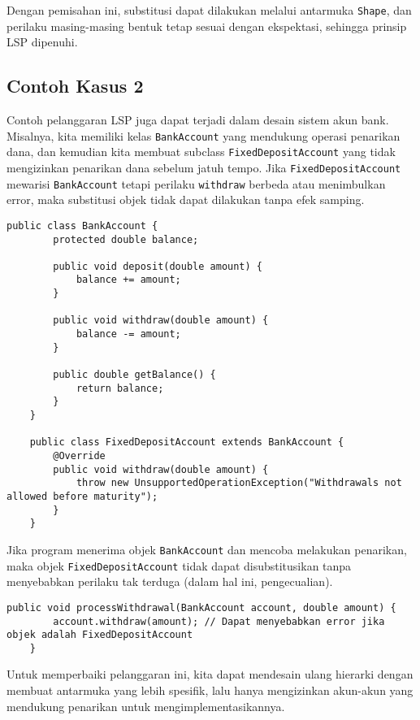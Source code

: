 Dengan pemisahan ini, substitusi dapat dilakukan melalui antarmuka \texttt{Shape}, dan perilaku masing-masing bentuk tetap sesuai dengan ekspektasi, sehingga prinsip LSP dipenuhi.


\subsection{Contoh Kasus 2}
Contoh pelanggaran LSP juga dapat terjadi dalam desain sistem akun bank. Misalnya, kita memiliki kelas \texttt{BankAccount} yang mendukung operasi penarikan dana, dan kemudian kita membuat subclass \texttt{FixedDepositAccount} yang tidak mengizinkan penarikan dana sebelum jatuh tempo. Jika \texttt{FixedDepositAccount} mewarisi \texttt{BankAccount} tetapi perilaku \texttt{withdraw} berbeda atau menimbulkan error, maka substitusi objek tidak dapat dilakukan tanpa efek samping.

\begin{lstlisting}[style=JavaStyle, caption={Contoh pelanggaran LSP}]
	public class BankAccount {
		protected double balance;
		
		public void deposit(double amount) {
			balance += amount;
		}
		
		public void withdraw(double amount) {
			balance -= amount;
		}
		
		public double getBalance() {
			return balance;
		}
	}
	
	public class FixedDepositAccount extends BankAccount {
		@Override
		public void withdraw(double amount) {
			throw new UnsupportedOperationException("Withdrawals not allowed before maturity");
		}
	}
\end{lstlisting}

Jika program menerima objek \texttt{BankAccount} dan mencoba melakukan penarikan, maka objek \texttt{FixedDepositAccount} tidak dapat disubstitusikan tanpa menyebabkan perilaku tak terduga (dalam hal ini, pengecualian).

\begin{lstlisting}[style=JavaStyle, caption={Pemanggilan yang melanggar LSP}]
	public void processWithdrawal(BankAccount account, double amount) {
		account.withdraw(amount); // Dapat menyebabkan error jika objek adalah FixedDepositAccount
	}
\end{lstlisting}

Untuk memperbaiki pelanggaran ini, kita dapat mendesain ulang hierarki dengan membuat antarmuka yang lebih spesifik, lalu hanya mengizinkan akun-akun yang mendukung penarikan untuk mengimplementasikannya.

